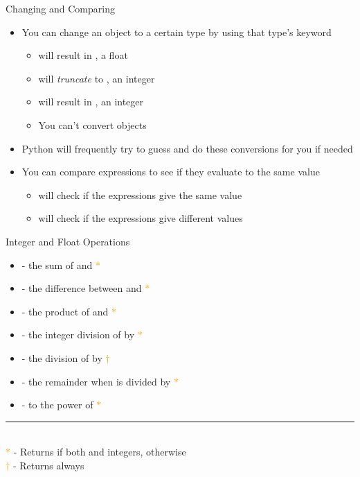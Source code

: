 \documentclass[pdf, aspectratio=169, 12pt]{beamer}
\begin{document}
\begin{frame}{Changing and Comparing}
	\begin{itemize}
		\item You can change an object to a certain type by using that type's keyword
			\begin{itemize}
				\item {} will result in , a float
				\item {} will \emph{truncate} to , an integer
				\item {} will result in , an integer
				\item You can't convert  objects
			\end{itemize}
		\item Python will frequently try to guess and do these conversions for you if needed
		\item You can compare expressions to see if they evaluate to the same value
			\begin{itemize}
				\item \pyi{==} will check if the expressions give the same value
				\item \pyi{!=} will check if the expressions give different values
			\end{itemize}
	\end{itemize}
\end{frame}

\newcommand{\marker}[1]{\textcolor{Orange}{$#1$}}
\begin{frame}{Integer and Float Operations}
	\begin{itemize}
		\item {} - the \alert{sum} of  and  \marker{*}
		\item {} - the \alert{difference} between  and  \marker{*}
		\item {} - the \alert{product} of  and  \marker{*}
		\item {} - the \alert{integer division} of  by  \marker{*}
		\item {} - the \alert{division} of  by  \marker{\dagger}
		\item {} - the \alert{remainder} when  is divided by  \marker{*}
		\item {} -  to the \alert{power} of  \marker{*}
	\end{itemize}
	\vfill
	\rule{4cm}{1pt}\\
	{\footnotesize%
		\marker{*} - Returns  if both  and  integers,  otherwise\\
		\marker{\dagger} - Returns  always
	}
\end{frame}
\end{document}

